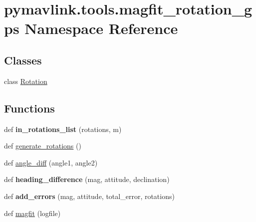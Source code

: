 \hypertarget{namespacepymavlink_1_1tools_1_1magfit__rotation__gps}{}\section{pymavlink.\+tools.\+magfit\+\_\+rotation\+\_\+gps Namespace Reference}
\label{namespacepymavlink_1_1tools_1_1magfit__rotation__gps}
\subsection*{Classes}
\begin{DoxyCompactItemize}
\item 
class \hyperlink{classpymavlink_1_1tools_1_1magfit__rotation__gps_1_1Rotation}{Rotation}
\end{DoxyCompactItemize}
\subsection*{Functions}
\begin{DoxyCompactItemize}
\item 
\mbox{\label{namespacepymavlink_1_1tools_1_1magfit__rotation__gps_a603524ffd72ee7855f58c5689c0903c2}} 
def {\bfseries in\+\_\+rotations\+\_\+list} (rotations, m)
\item 
def \hyperlink{namespacepymavlink_1_1tools_1_1magfit__rotation__gps_acb9dbe90061d5435cea646ad6dfa6a75}{generate\+\_\+rotations} ()
\item 
def \hyperlink{namespacepymavlink_1_1tools_1_1magfit__rotation__gps_a497516bc1636ac24a1df1d8d08440dab}{angle\+\_\+diff} (angle1, angle2)
\item 
\mbox{\label{namespacepymavlink_1_1tools_1_1magfit__rotation__gps_a310cbaeb70b1110d0e0c30bb055849c6}} 
def {\bfseries heading\+\_\+difference} (mag, attitude, declination)
\item 
\mbox{\label{namespacepymavlink_1_1tools_1_1magfit__rotation__gps_a07a846988f01406b07262b59f194bc0c}} 
def {\bfseries add\+\_\+errors} (mag, attitude, total\+\_\+error, rotations)
\item 
def \hyperlink{namespacepymavlink_1_1tools_1_1magfit__rotation__gps_a3c0d998ef7946658f7d3085301310b90}{magfit} (logfile)
\end{DoxyCompactItemize}
